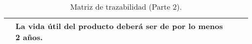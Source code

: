\begin{table}[H]
\begin{tabular}{|c|l|l|l|}
                                 & La vida útil del producto deberá ser de por lo menos 2 años.                                                                                                                                                         &                                                       &                                                                                                            \\ \hline
\end{tabular}
\caption{Matriz de trazabilidad (Parte 2).}
\end{table}